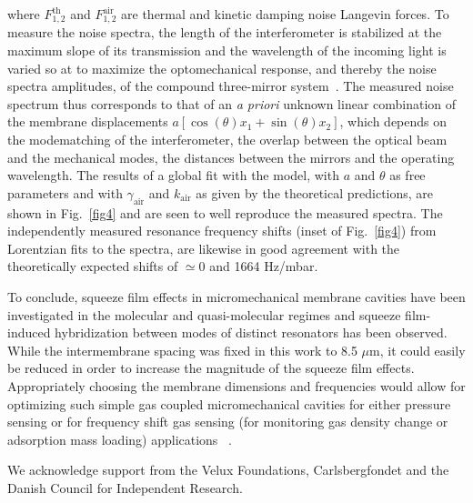 \documentclass[pra,twocolumn,superscriptaddress,notitlepage]{revtex4-1}
\begin{document}
where $F_{1,2}^{\textrm{th}}$ and $F_{1,2}^{\textrm{air}}$ are thermal and kinetic damping noise Langevin forces. To measure the noise spectra, the length of the interferometer is stabilized at the maximum slope of its transmission and the wavelength of the incoming light is varied so at to maximize the optomechanical response, and thereby the noise spectra amplitudes, of the compound three-mirror system~\cite{Genes2017}. The measured noise spectrum thus corresponds to that of an \textit{a priori} unknown linear combination of the membrane displacements $a[\cos(\theta)x_1+\sin(\theta)x_2]$, which depends on the modematching of the interferometer, the overlap between the optical beam and the mechanical modes, the distances between the mirrors and the operating wavelength. The results of a global fit with the model, with $a$ and $\theta$ as free parameters and with $\gamma_{\textrm{air}}$ and $k_{\textrm{air}}$ as given by the theoretical predictions, are shown in Fig.~\ref{fig4} and are seen to well reproduce the measured spectra. The independently measured resonance frequency shifts (inset of Fig.~\ref{fig4}) from Lorentzian fits to the spectra, are likewise in good agreement with the theoretically expected shifts of $\simeq 0$ and 1664 Hz/mbar.

To conclude, squeeze film effects in micromechanical membrane cavities have been investigated in the molecular and quasi-molecular regimes and squeeze film-induced hybridization between modes of distinct resonators has been observed. While the intermembrane spacing was fixed in this work to 8.5 $\mu$m, it could easily be reduced in order to increase the magnitude of the squeeze film effects. Appropriately choosing the membrane dimensions and frequencies would allow for optimizing such simple gas coupled micromechanical cavities for either pressure sensing or for frequency shift gas sensing (for monitoring gas density change or adsorption mass loading) applications ~\cite{Suijlen2009}.

We acknowledge support from the Velux Foundations, Carlsbergfondet and the Danish Council for Independent Research.


\end{document}
